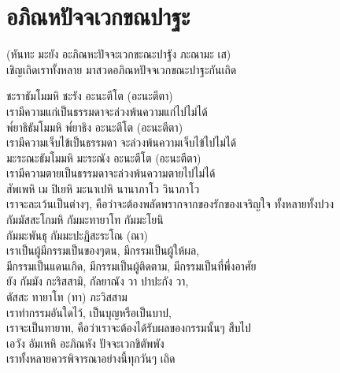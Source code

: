 \documentclass{article}
\begin{document}
\pagebreak
\section{อภิณหปัจจเวกขณปาฐะ}
\begin{center}
(หันทะ มะยัง อะภิณหะปัจจะเวกขะณะปาฐัง ภะณามะ เส)\\
เชิญเถิดเราทั้งหลาย มาสวดอภิณหปัจจเวกขณะปาฐะกันเถิด
\end{center}
ชะราธัมโมมหิ ชะรัง อะนะตีโต (อะนะตีตา) \\
\indent เรามีความแก่เป็นธรรมดาจะล่วงพ้นความแก่ไปไม่ได้\\
พ๎ยาธิธัมโมมหิ พ๎ยาธิง อะนะตีโต (อะนะตีตา)  \\
\indent เรามีความเจ็บไข้เป็นธรรมดา จะล่วงพ้นความเจ็บไข้ไปไม่ได้\\
มะระณะธัมโมมหิ มะระณัง อะนะตีโต (อะนะตีตา) \\
\indent เรามีความตายเป็นธรรมดาจะล่วงพ้นความตายไปไม่ได้\\
สัพเพหิ เม ปิเยหิ มะนาเปหิ นานาภาโว วินาภาโว\\
\indent เราจะละเว้นเป็นต่างๆ, คือว่าจะต้องพลัดพรากจากของรักของเจริญใจ ทั้งหลายทั้งปวง\\
กัมมัสสะโกมหิ กัมมะทายาโท กัมมะโยนิ\\
กัมมะพันธุ กัมมะปะฏิสะระโณ (ณา)  \\
\indent เราเป็นผู้มีกรรมเป็นของๆตน, มีกรรมเป็นผู้ให้ผล,\\
มีกรรมเป็นแดนเกิด, มีกรรมเป็นผู้ติดตาม, มีกรรมเป็นที่พึ่งอาศัย\\
ยัง กัมมัง กะริสสามิ, กัลยาณัง วา ปาปะกัง วา,\\
ตัสสะ ทายาโท (ทา)  ภะวิสสาม\\
\indent เราทำกรรมอันใดไว้, เป็นบุญหรือเป็นบาป,\\
เราจะเป็นทายาท, คือว่าเราจะต้องได้รับผลของกรรมนั้นๆ สืบไป\\
เอวัง อัมเหหิ อะภิณหัง ปัจจะเวกขิตัพพัง\\
\indent เราทั้งหลายควรพิจารณาอย่างนี้ทุกวันๆ เถิด

\pagebreak
\end{document}
